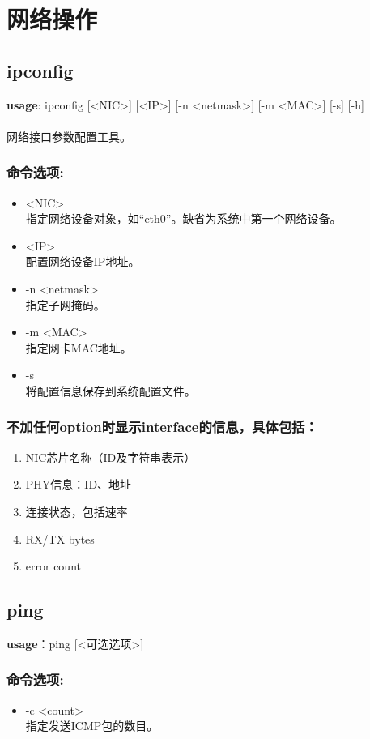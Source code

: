 \section{网络操作}

\subsection{ipconfig}
\textbf{usage}: ipconfig [<NIC>] [<IP>] [-n <netmask>] [-m <MAC>] [-s] [-h] \\
\\ 网络接口参数配置工具。

\subsubsection{命令选项:}
\begin{itemize}
	\item <NIC> \\
	指定网络设备对象，如``eth0''。缺省为系统中第一个网络设备。
	\item <IP> \\
	配置网络设备IP地址。
	\item -n <netmask> \\
	指定子网掩码。
	\item -m <MAC> \\
	指定网卡MAC地址。
	\item -s \\
	将配置信息保存到系统配置文件。
\end{itemize}

\subsubsection{不加任何option时显示interface的信息，具体包括：}
\begin{enumerate} \setlength{\itemsep}{-\itemsep}
	\item NIC芯片名称（ID及字符串表示）
	\item PHY信息：ID、地址
	\item 连接状态，包括速率
	\item RX/TX bytes
	\item error count
\end{enumerate}

\subsection{ping}
\textbf{usage}：ping [<可选选项>]

\subsubsection{命令选项:}
\begin{itemize}
	\item -c <count> \\
	指定发送ICMP包的数目。
\end{itemize}

